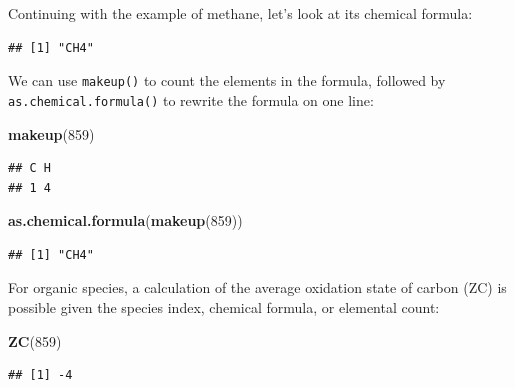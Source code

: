 \documentclass[]{tufte-book}
\newenvironment{Shaded}{}{}
\newcommand{\KeywordTok}[1]{\textcolor[rgb]{0.00,0.44,0.13}{\textbf{#1}}}
\newcommand{\DecValTok}[1]{\textcolor[rgb]{0.25,0.63,0.44}{#1}}
\newcommand{\OperatorTok}[1]{\textcolor[rgb]{0.40,0.40,0.40}{#1}}
\newcommand{\NormalTok}[1]{#1}
\begin{document}
Continuing with the example of methane, let's look at its chemical
formula:

\begin{Shaded}
\end{Shaded}

\begin{verbatim}
## [1] "CH4"
\end{verbatim}

We can use {\texttt{makeup()}} to count the elements in the formula,
followed by {\texttt{as.chemical.formula()}} to rewrite the formula on
one line:

\begin{Shaded}
\begin{Highlighting}[]
\KeywordTok{makeup}\NormalTok{(}\DecValTok{859}\NormalTok{)}
\end{Highlighting}
\end{Shaded}

\begin{verbatim}
## C H 
## 1 4
\end{verbatim}

\begin{Shaded}
\begin{Highlighting}[]
\KeywordTok{as.chemical.formula}\NormalTok{(}\KeywordTok{makeup}\NormalTok{(}\DecValTok{859}\NormalTok{))}
\end{Highlighting}
\end{Shaded}

\begin{verbatim}
## [1] "CH4"
\end{verbatim}

For organic species, a calculation of the average oxidation state of
carbon (ZC) is possible given the species index, chemical formula, or
elemental count:

\begin{Shaded}
\begin{Highlighting}[]
\KeywordTok{ZC}\NormalTok{(}\DecValTok{859}\NormalTok{)}
\end{Highlighting}
\end{Shaded}

\begin{verbatim}
## [1] -4
\end{verbatim}

\begin{Shaded}
\end{Shaded}
\end{document}
